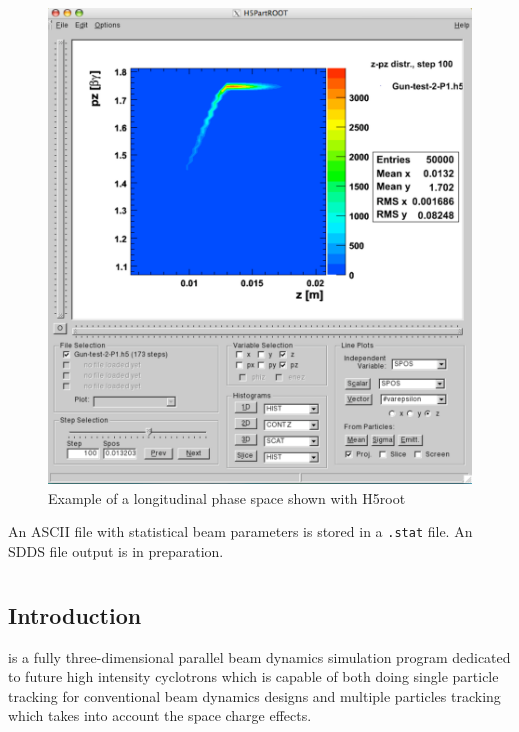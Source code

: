 \begin{figure}[ht]
 \begin{center}
   \includegraphics[width=.9\linewidth,angle=0]{figures/H5rootPicture3}
  \caption{Example of a longitudinal phase space shown with H5root}
  \label{fig:h5root2}
 \end{center}
\end{figure}



An ASCII file with statistical beam
parameters is stored in a {\tt .stat} file. An SDDS file output is in preparation.

\section{\opalcycl}
\label{sec:opalcycl}

\subsection{Introduction}

\opalcycl is a fully three-dimensional parallel beam dynamics simulation program dedicated to future high intensity cyclotrons
which is capable of both doing single particle tracking for conventional beam dynamics designs and
multiple particles tracking which takes into account the space charge effects.

